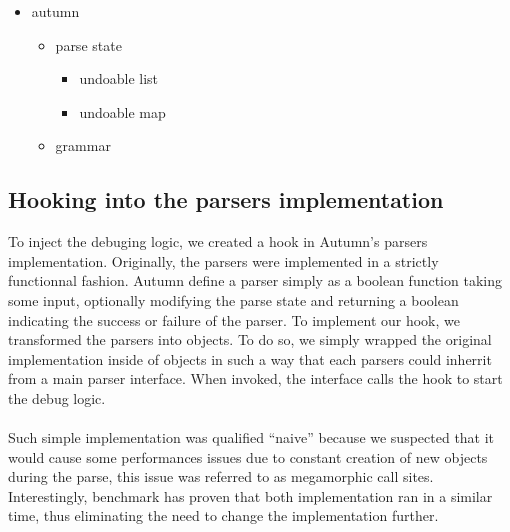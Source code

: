 \begin{itemize}
	\item autumn
	\begin{itemize}
		\item parse state
		\begin{itemize}
			\item undoable list
			\item undoable map
		\end{itemize}
		\item grammar
	\end{itemize}
\end{itemize}

	\subsection{Hooking into the parsers implementation}
%
	To inject the debuging logic, we created a hook in Autumn's parsers implementation. Originally, the parsers were implemented in a strictly functionnal fashion. Autumn define a parser simply as a boolean function taking some input, optionally modifying the parse state and returning a boolean indicating the success or failure of the parser. To implement our hook, we transformed the parsers into objects. To do so, we simply wrapped the original implementation inside of objects in such a way that each parsers could inherrit from a main parser interface. When invoked, the interface calls the hook to start the debug logic.

	\paragraph{}

	Such simple implementation was qualified ``naive'' because we suspected that it would cause some performances issues due to constant creation of new objects during the parse, this issue was referred to as megamorphic call sites. Interestingly, benchmark has proven that both implementation ran in a similar time, thus eliminating the need to change the implementation further.

%

